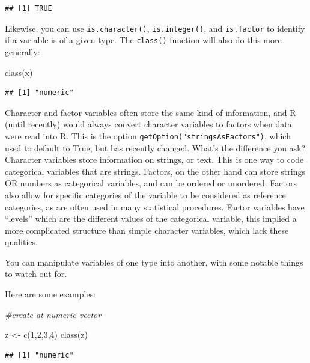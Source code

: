 \documentclass[
]{book}
\newenvironment{Shaded}{\begin{snugshade}}{\end{snugshade}}
\newcommand{\CommentTok}[1]{\textcolor[rgb]{0.56,0.35,0.01}{\textit{#1}}}
\newcommand{\DecValTok}[1]{\textcolor[rgb]{0.00,0.00,0.81}{#1}}
\newcommand{\FunctionTok}[1]{\textcolor[rgb]{0.00,0.00,0.00}{#1}}
\newcommand{\NormalTok}[1]{#1}
\newcommand{\OtherTok}[1]{\textcolor[rgb]{0.56,0.35,0.01}{#1}}
\begin{document}
\begin{verbatim}
## [1] TRUE
\end{verbatim}

Likewise, you can use \texttt{is.character()}, \texttt{is.integer()}, and \texttt{is.factor}
to identify if a variable is of a given type. The \texttt{class()} function
will also do this more generally:

\begin{Shaded}
\begin{Highlighting}[]
\FunctionTok{class}\NormalTok{(x)}
\end{Highlighting}
\end{Shaded}

\begin{verbatim}
## [1] "numeric"
\end{verbatim}

Character and factor variables often store the same kind of information,
and R (until recently) would always convert character variables to
factors when data were read into R. This is the option
\texttt{getOption("stringsAsFactors")}, which used to default to True, but has
recently changed. What's the difference you ask? Character variables
store information on strings, or text. This is one way to code
categorical variables that are strings. Factors, on the other hand can
store strings OR numbers as categorical variables, and can be ordered or
unordered. Factors also allow for specific categories of the variable to
be considered as reference categories, as are often used in many
statistical procedures. Factor variables have ``levels'' which are the
different values of the categorical variable, this implied a more
complicated structure than simple character variables, which lack these
qualities.

You can manipulate variables of one type into another, with some notable
things to watch out for.

Here are some examples:

\begin{Shaded}
\begin{Highlighting}[]
\CommentTok{\#create at numeric vector}

\NormalTok{z }\OtherTok{\textless{}{-}}  \FunctionTok{c}\NormalTok{(}\DecValTok{1}\NormalTok{,}\DecValTok{2}\NormalTok{,}\DecValTok{3}\NormalTok{,}\DecValTok{4}\NormalTok{)}
\FunctionTok{class}\NormalTok{(z)}
\end{Highlighting}
\end{Shaded}

\begin{verbatim}
## [1] "numeric"
\end{verbatim}
\end{document}
